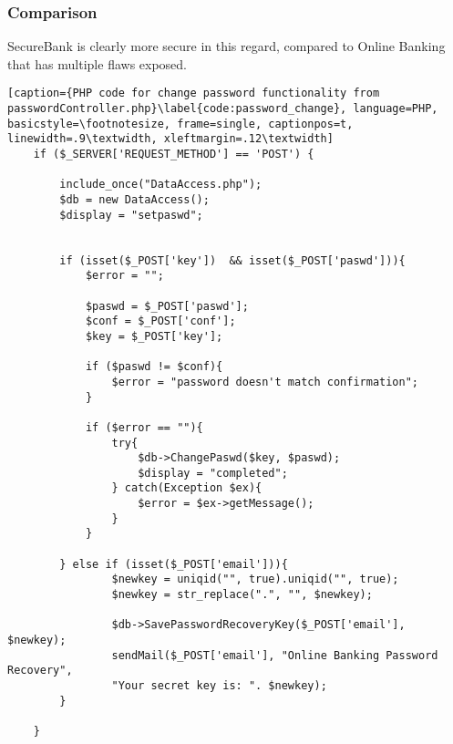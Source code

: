 \subsubsection{Comparison}
SecureBank is clearly more secure in this regard, compared to Online Banking that has multiple flaws exposed.

\begin{lstlisting}[caption={PHP code for change password functionality from passwordController.php}\label{code:password_change}, language=PHP, basicstyle=\footnotesize, frame=single, captionpos=t, linewidth=.9\textwidth, xleftmargin=.12\textwidth]
    if ($_SERVER['REQUEST_METHOD'] == 'POST') {

        include_once("DataAccess.php");
        $db = new DataAccess();
        $display = "setpaswd";


        if (isset($_POST['key'])  && isset($_POST['paswd'])){
            $error = "";

            $paswd = $_POST['paswd'];
            $conf = $_POST['conf'];
            $key = $_POST['key'];

            if ($paswd != $conf){
                $error = "password doesn't match confirmation";
            }

            if ($error == ""){
                try{
                    $db->ChangePaswd($key, $paswd);
                    $display = "completed";
                } catch(Exception $ex){
                    $error = $ex->getMessage();
                }
            }

        } else if (isset($_POST['email'])){
                $newkey = uniqid("", true).uniqid("", true);
                $newkey = str_replace(".", "", $newkey);

                $db->SavePasswordRecoveryKey($_POST['email'], $newkey);
                sendMail($_POST['email'], "Online Banking Password Recovery",
                "Your secret key is: ". $newkey);
        }

    }
\end{lstlisting}

\clearpage